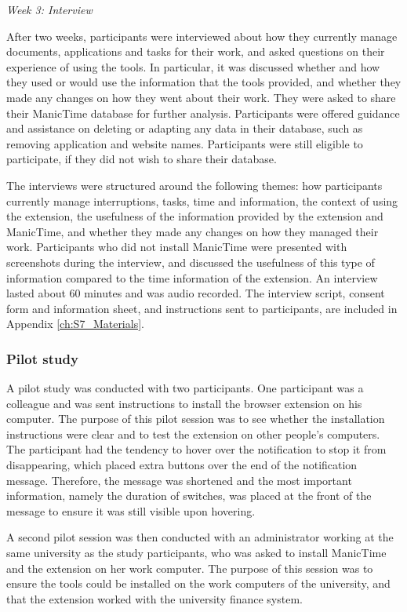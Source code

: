 \textit{Week 3: Interview}

After two weeks, participants were interviewed about how they currently manage documents, applications and tasks for their work, and asked questions on their experience of using the tools. In particular, it was discussed whether and how they used or would use the information that the tools provided, and whether they made any changes on how they went about their work. They were asked to share their ManicTime database for further analysis. Participants were offered guidance and assistance on deleting or adapting any data in their database, such as removing application and website names. Participants were still eligible to participate, if they did not wish to share their database.

The interviews were structured around the following themes: how participants currently manage interruptions, tasks, time and information, the context of using the extension, the usefulness of the information provided by the extension and ManicTime, and whether they made any changes on how they managed their work. Participants who did not install ManicTime were presented with screenshots during the interview, and discussed the usefulness of this type of information compared to the time information of the extension. An interview lasted about 60 minutes and was audio recorded. The interview script, consent form and information sheet, and instructions sent to participants, are included in Appendix \ref{ch:S7_Materials}.

\subsubsection{Pilot study}
A pilot study was conducted with two participants. One participant was a colleague and was sent instructions to install the browser extension on his computer. The purpose of this pilot session was to see whether the installation instructions were clear and to test the extension on other people's computers. The participant had the tendency to hover over the notification to stop it from disappearing, which placed extra buttons over the end of the notification message. Therefore, the message was shortened and the most important information, namely the duration of switches, was placed at the front of the message to ensure it was still visible upon hovering.

A second pilot session was then conducted with an administrator working at the same university as the study participants, who was asked to install ManicTime and the extension on her work computer. The purpose of this session was to ensure the tools could be installed on the work computers of the university, and that the extension worked with the university finance system.

